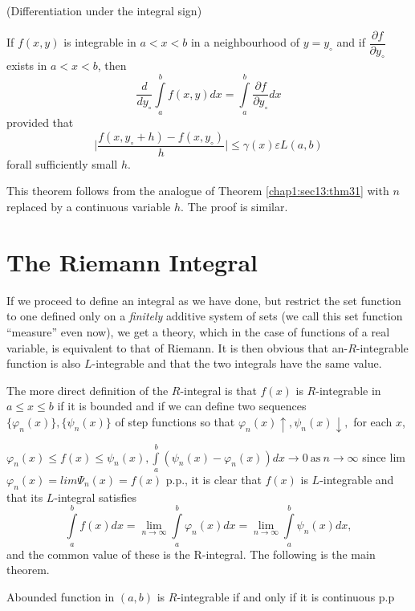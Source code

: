 \begin{theorem}\label{chap1:sec13:thm34} 
  (Differentiation under the integral sign)
  
  If $f(x, y)$ is integrable in $a<x<b$ in a neighbourhood of
  $y=y_\circ$ and if $\dfrac{\partial f}{\partial y_\circ}$ exists in
  $a<x<b$, then  
   $$
  \frac{d}{dy_\circ}\int\limits^b_a f(x,y)dx=\int\limits^b_a
  \frac{\partial f}{\partial  y_\circ}dx
 $$  
 provided that  
  $$
 \bigg|\frac{f\left(x,y_\circ+h\right)-f\left(x,y_\circ\right)}{h}\bigg|\leq
 \gamma(x)\varepsilon L (a,b)
  $$
 for\pageoriginale all sufficiently small $h$.
\end{theorem}

 This theorem follows from the analogue of
 Theorem \ref{chap1:sec13:thm31} with $n$ replaced 
 by a continuous variable $h$. The proof is similar.  
 
 \section{The Riemann Integral}\label{chap1:sec14} 

 If we proceed to define an integral as we have done, but restrict the
 set function to one defined only on a \textit{finitely} additive system of
 sets (we call this set function ``measure'' even now), we  
 get a theory, which in the case of functions of a real variable, is
 equivalent to that of Riemann. It is then obvious that
 an-$R$-integrable function is also $L$-integrable and that the two
 integrals have the same value. 
 
 
 The  more direct definition of the $R$-integral is that $f(x)$ is
 $R$-inte\-grable in $a\leq  x\leq  b$ if it is bounded and if we can
 define two sequences $\{ \varphi_n(x)\},\{\psi_n(x)\}$ of step
 functions so that $\varphi_n(x)\uparrow,\psi_n(x)\downarrow,$ for
 each $x$, 
 
 $\varphi_n(x)\leq  f(x)\leq
 \psi_n(x),\int\limits^b_a(\psi_n(x)-\varphi_n(x)) dx \rightarrow 0
 ~\text{as}~ n  \rightarrow \infty $ since lim $\varphi_n(x)=lim \Psi_n(x)=f(x)$
 p.p., it is clear that $f(x)$ is $L$-integrable and that its $L$-integral
 satisfies  
 $$
 \int\limits^b_a f(x) dx=\lim\limits_{n\rightarrow
   \infty}\int\limits^b_a\varphi_n(x)dx=\lim\limits_ {n\rightarrow 
   \infty}\int\limits^b_a\psi_n(x)dx,
  $$ 
 and the common value of these is the R-integral. The following is
 the main theorem. 

\begin{theorem}\label{chap1:sec14:thm35} 
 A\pageoriginale bounded function in $(a,b)$ is $R$-integrable if and
 only if it is continuous p.p 
\end{theorem}


